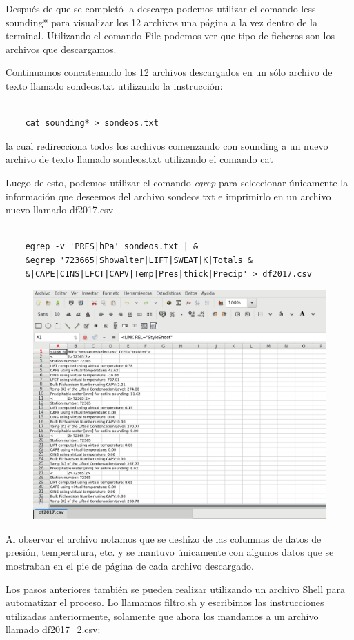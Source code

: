 \documentclass{article}
\begin{document}
Después de que se completó la descarga podemos utilizar el comando less sounding* para visualizar los 12 archivos una página a la vez dentro de la terminal. Utilizando el comando File podemos ver que tipo de ficheros son los archivos que descargamos.

Continuamos concatenando los 12 archivos descargados en un sólo archivo de texto llamado sondeos.txt utilizando la instrucción:
\begin{verbatim}
	
    cat sounding* > sondeos.txt
\end{verbatim}
la cual redirecciona todos los archivos comenzando con sounding a un nuevo archivo de texto llamado sondeos.txt utilizando el comando cat

Luego de esto, podemos utilizar el comando \textit{egrep} para seleccionar únicamente la información que deseemos del archivo sondeos.txt e imprimirlo en un archivo nuevo llamado df2017.csv
\begin{verbatim}
	
    egrep -v 'PRES|hPa' sondeos.txt | &
    &egrep '723665|Showalter|LIFT|SWEAT|K|Totals &
    &|CAPE|CINS|LFCT|CAPV|Temp|Pres|thick|Precip' > df2017.csv
\end{verbatim}

\begin{figure}[h!]
\centering
\includegraphics[width=0.5\linewidth]{df2017.png}
\end{figure}

Al observar el archivo notamos que se deshizo de las columnas de datos de presión, temperatura, etc. y se mantuvo únicamente con algunos datos que se mostraban en el pie de página de cada archivo descargado.

Los pasos anteriores también se pueden realizar utilizando un archivo Shell para automatizar el proceso.
Lo llamamos filtro.sh y escribimos las instrucciones utilizadas anteriormente, solamente que ahora los mandamos a un archivo llamado df2017\_2.csv: ~\\
\end{document}
